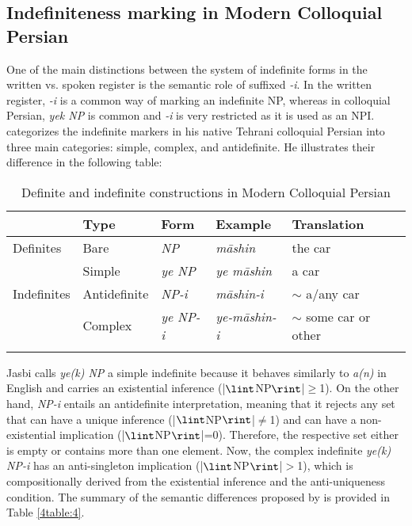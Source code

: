 \documentclass[output=paper]{langsci/langscibook}
\begin{document}
\subsection{Indefiniteness marking in Modern Colloquial Persian}\label{4sec:33}

One of the main distinctions between the system of indefinite forms in the written vs. spoken register is the semantic role of suffixed {\emph{-i}}. In the written register, {\emph{-i}} is a common way of marking an indefinite NP, whereas in colloquial Persian, {\emph{yek NP}} is common and {\emph{-i}} is very restricted as it is used as an NPI. \cite[][246]{jasbi:16} categorizes the indefinite markers in his native Tehrani colloquial Persian into three main categories: simple, complex, and antidefinite. He illustrates their difference in the following table:

\begin{table}[H]
\centering
\begin{tabular}{lllll}
\lsptoprule
	& Type		& Form		& Example	& Translation \\
\midrule
Definites & Bare & {\emph{NP}} & {\emph{māshin}} & the car \\[1mm]
\hdashline
			& Simple & {\emph{ye NP}}	 & {\emph{ye māshin}} & a car \\
Indefinites	 	& Antidefinite & {\emph{NP-i}} & {\emph{māshin-i}}	 & $\sim$ a/any car \\
			& Complex & {\emph{ye NP-i}} & {\emph{ye-māshin-i}} & $\sim$ some car or other \\
\lspbottomrule
\end{tabular}
\caption{Definite and indefinite constructions in Modern Colloquial \mbox{Persian} \citep[][246]{jasbi:16}}\label{4table:3}
\end{table}

Jasbi calls {\emph{ye(k) NP}} a simple indefinite because it behaves similarly to {\emph{a(n)}} in English and carries an existential inference (|$\lint$NP$\rint$|$\geq$1). On the other hand, {\emph{NP-i}} entails an antidefinite interpretation, meaning that it rejects any set that can have a unique inference (|$\lint$NP$\rint$|$\not=$1) and can have a non-existential implication (|$\lint$NP$\rint$|=0). Therefore, the respective set either is empty or contains more than one element. Now, the complex indefinite {\emph{ye(k) NP-i}} has an anti-singleton implication (|$\lint$NP$\rint$|$>$1), which is compositionally derived from the existential inference and the anti-uniqueness condition. The summary of the semantic differences proposed by \cite[][251]{jasbi:16} is provided in Table \ref{4table:4}.
\end{document}
